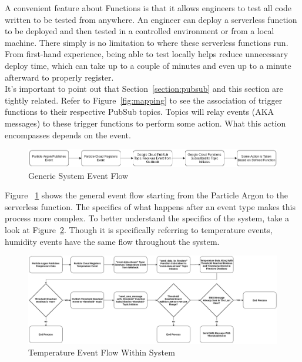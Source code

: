 \documentclass{article}
\begin{document}
A convenient feature about Functions is that it allows engineers to test all code written to be tested from anywhere. An engineer can deploy a serverless function to be deployed and then tested in a controlled environment or from a local machine. There simply is no limitation to where these serverless functions run. From first-hand experience, being able to test locally helps reduce unnecessary deploy time, which can take up to a couple of minutes and even up to a minute afterward to properly register.\\

It's important to point out that Section~\ref{section:pubsub} and this section are tightly related. Refer to Figure~\ref{fig:mapping} to see the association of trigger functions to their respective PubSub topics. Topics will relay events (AKA messages) to these trigger functions to perform some action. What this action encompasses depends on the event.\\

\begin{figure}[H]
	\center
	\includegraphics[width=\textwidth]{images/generic-temperature-humidity-flow.png}
	\caption{Generic System Event Flow}
	\label{fig:event-flow}
\end{figure}

Figure ~\ref{fig:event-flow} shows the general event flow starting from the Particle Argon to the serverless function. The specifics of what happens after an event type makes this process more complex. To better understand the specifics of the system, take a look at Figure~\ref{fig:climate-event-flow}. Though it is specifically referring to temperature events, humidity events have the same flow throughout the system.

\begin{figure}[H]
	\center
	\includegraphics[width=\textwidth]{images/climate-event-flow.png}
	\caption{Temperature Event Flow Within System}
	\label{fig:climate-event-flow}
\end{figure}
\end{document}

